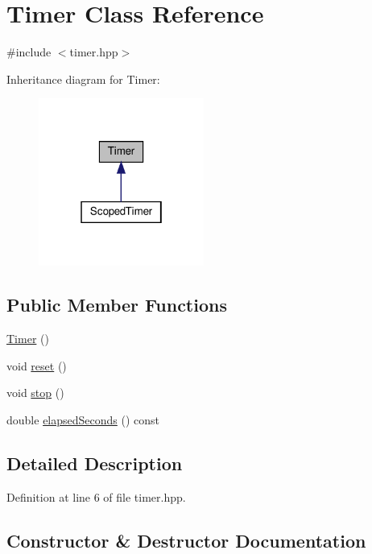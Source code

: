 \hypertarget{class_timer}{}\section{Timer Class Reference}
\label{class_timer}


{\ttfamily \#include $<$timer.\+hpp$>$}



Inheritance diagram for Timer\+:
\nopagebreak
\begin{figure}[H]
\begin{center}
\leavevmode
\includegraphics[width=154pt]{class_timer__inherit__graph}
\end{center}
\end{figure}
\subsection*{Public Member Functions}
\begin{DoxyCompactItemize}
\item 
\hyperlink{class_timer_a5f16e8da27d2a5a5242dead46de05d97}{Timer} ()
\item 
void \hyperlink{class_timer_a9020542d73357a4eef512eefaf57524b}{reset} ()
\item 
void \hyperlink{class_timer_a63f0eb44b27402196590a03781515dba}{stop} ()
\item 
double \hyperlink{class_timer_ab98eee549aa6c69eb83de41ed555d1e0}{elapsed\+Seconds} () const
\end{DoxyCompactItemize}


\subsection{Detailed Description}


Definition at line 6 of file timer.\+hpp.



\subsection{Constructor \& Destructor Documentation}
\mbox{\label{class_timer_a5f16e8da27d2a5a5242dead46de05d97}} 
